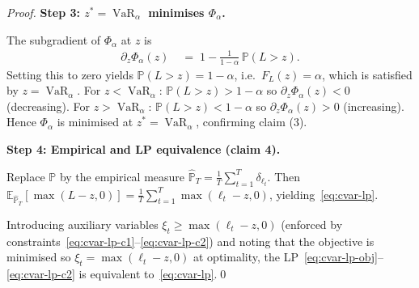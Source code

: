 \documentclass[12pt,openany]{book}
\newcommand{\E}{\mathbb{E}}
\numberwithin{equation}{chapter}
\theoremstyle{plain}
\theoremstyle{definition}
\theoremstyle{remark}
\numberwithin{equation}{chapter}
\theoremstyle{plain}
\DeclareMathOperator{\VaR}{VaR}
\begin{document}
\begin{proof}
\medskip
\noindent\textbf{Step 3: $z^* = \VaR_\alpha$ minimises $\Phi_\alpha$.}

The subgradient of $\Phi_\alpha$ at $z$ is
\begin{align}
  \partial_z \Phi_\alpha(z)
    &\;=\; 1 - \frac{1}{1-\alpha}\,\mathbb{P}(L > z).
    \label{eq:subgrad}
\end{align}
Setting this to zero yields $\mathbb{P}(L > z) = 1 - \alpha$, i.e.\
$F_L(z) = \alpha$, which is satisfied by $z = \VaR_\alpha$.
For $z < \VaR_\alpha$: $\mathbb{P}(L > z) > 1-\alpha$ so
$\partial_z \Phi_\alpha(z) < 0$ (decreasing).
For $z > \VaR_\alpha$: $\mathbb{P}(L > z) < 1-\alpha$ so
$\partial_z \Phi_\alpha(z) > 0$ (increasing).
Hence $\Phi_\alpha$ is minimised at $z^* = \VaR_\alpha$, confirming
claim (3).

\medskip
\noindent\textbf{Step 4: Empirical and LP equivalence (claim 4).}

Replace $\mathbb{P}$ by the empirical measure
$\hat{\mathbb{P}}_T = \frac{1}{T}\sum_{t=1}^T \delta_{\ell_t}$.
Then $\E_{\hat{\mathbb{P}}_T}[\max(L-z,0)]
= \frac{1}{T}\sum_{t=1}^T \max(\ell_t - z, 0)$, yielding~\eqref{eq:cvar-lp}.

Introducing auxiliary variables $\xi_t \geq \max(\ell_t - z, 0)$
(enforced by constraints~\eqref{eq:cvar-lp-c1}--\eqref{eq:cvar-lp-c2})
and noting that the objective is minimised so $\xi_t = \max(\ell_t - z, 0)$
at optimality, the LP~\eqref{eq:cvar-lp-obj}--\eqref{eq:cvar-lp-c2}
is equivalent to~\eqref{eq:cvar-lp}.\qed
\end{proof}
\end{document}
